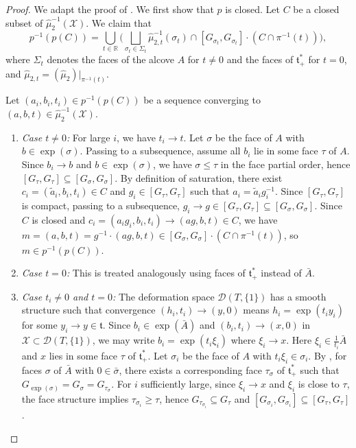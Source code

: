 \documentclass[reqno]{amsart}
\theoremstyle{plain}
\theoremstyle{definition}
\begin{document}
\begin{proof}
We adapt the proof of \cite[]{guillemin2002}. We first show that $p$ is closed. Let $C$ be a closed subset of $\widehat{\mu}_2^{-1}(\mathcal{X})$. We claim that
\[
p^{-1}(p(C)) = \bigcup_{t \in \mathbb{R}} \biggl(\bigsqcup_{\sigma_t \in \Sigma_t} \widehat{\mu}_{2,t}^{-1}(\sigma_t) \cap [G_{\sigma_t}, G_{\sigma_t}] \cdot (C \cap \pi^{-1}(t))\biggr),
\]
where $\Sigma_t$ denotes the faces of the alcove $A$ for $t \neq 0$ and the faces of $\mathfrak{t}^*_+$ for $t = 0$, and $\widehat{\mu}_{2,t} = (\widehat{\mu}_2)|_{\pi^{-1}(t)}$.

Let $(a_i, b_i, t_i) \in p^{-1}(p(C))$ be a sequence converging to $(a, b, t) \in \widehat{\mu}_2^{-1}(\mathcal{X})$.\\


\begin{enumerate}
\item \emph{Case $t \neq 0$:} For large $i$, we have $t_i \to t$. Let $\sigma$ be the face of $A$ with $b \in \exp(\sigma)$. Passing to a subsequence, assume all $b_i$ lie in some face $\tau$ of $A$. Since $b_i \to b$ and $b \in \exp(\sigma)$, we have $\sigma \leq \tau$ in the face partial order, hence $[G_\tau, G_\tau] \subseteq [G_\sigma, G_\sigma]$. By definition of saturation, there exist $c_i = (\tilde{a}_i, b_i, t_i) \in C$ and $g_i \in [G_\tau, G_\tau]$ such that $a_i = \tilde{a}_i g_i^{-1}$. Since $[G_\tau, G_\tau]$ is compact, passing to a subsequence, $g_i \to g \in [G_\tau, G_\tau] \subseteq [G_\sigma, G_\sigma]$. Since $C$ is closed and $c_i = (a_i g_i, b_i, t_i) \to (ag, b, t) \in C$, we have $m = (a, b, t) = g^{-1} \cdot (ag, b, t) \in [G_\sigma, G_\sigma] \cdot (C \cap \pi^{-1}(t))$, so $m \in p^{-1}(p(C))$.\\

\item \emph{Case $t = 0$:} This is treated analogously using faces of $\mathfrak{t}^*_+$ instead of $\bar{A}$.\\

\item \emph{Case $t_i \neq 0$ and $t = 0$:} The deformation space $\mathcal{D}(T, \{1\})$ has a smooth structure such that convergence $(h_i, t_i) \to (y, 0)$ means $h_i = \exp(t_i y_i)$ for some $y_i \to y \in \mathfrak{t}$. Since $b_i \in \exp(\bar{A})$ and $(b_i, t_i) \to (x, 0)$ in $\mathcal{X} \subset \mathcal{D}(T, \{1\})$, we may write $b_i = \exp(t_i \xi_i)$ where $\xi_i \to x$. Here $\xi_i \in \frac{1}{t_i}\bar{A}$ and $x$ lies in some face $\tau$ of $\mathfrak{t}^*_+$. Let $\sigma_i$ be the face of $A$ with $t_i \xi_i \in \sigma_i$. By \cite[Appendix~A.3]{hurtubise2006group}, for faces $\sigma$ of $\bar{A}$ with $0 \in \bar{\sigma}$, there exists a corresponding face $\tau_\sigma$ of $\mathfrak{t}^*_+$ such that $G_{\exp(\sigma)} = G_\sigma = G_{\tau_\sigma}$. For $i$ sufficiently large, since $\xi_i \to x$ and $\xi_i$ is close to $\tau$, the face structure implies $\tau_{\sigma_i} \geq \tau$, hence $G_{\tau_{\sigma_i}} \subseteq G_\tau$ and $[G_{\sigma_i}, G_{\sigma_i}] \subseteq [G_\tau, G_\tau]$.


\end{enumerate}
\end{proof}
\end{document}
